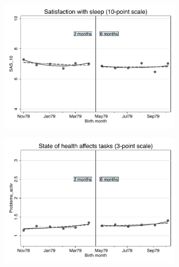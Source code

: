 \documentclass[a4paper ]{article}
\begin{document}
\begin{figure}[p]
\begin{subfigure}[h]{0.48\textwidth}\centering
	\includegraphics[width=\textwidth]{../../analysis/graphs/SOEP/SAS_10_RD.pdf}
\end{subfigure}
\quad
\begin{subfigure}[h]{0.48\textwidth}\centering
	\includegraphics[width=\textwidth]{../../analysis/graphs/SOEP/Problems_activ_RD.pdf}
\end{subfigure}




\end{figure}
\end{document}
